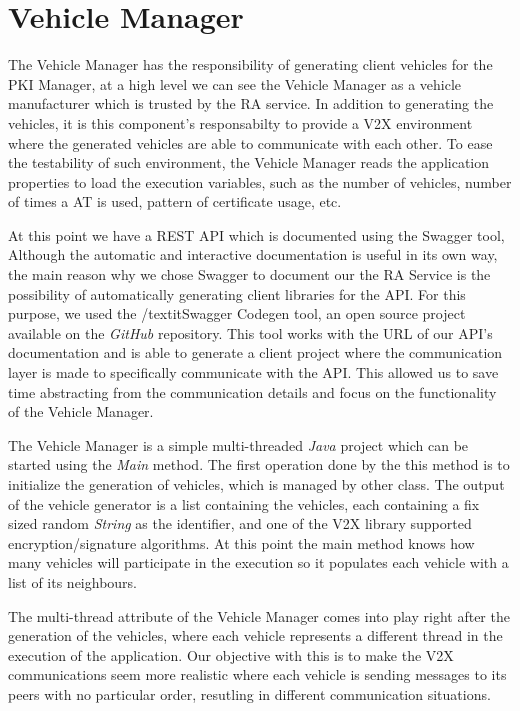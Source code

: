 \section{Vehicle Manager}
The Vehicle Manager has the responsibility of generating client vehicles for the PKI Manager, at a high level we can see the Vehicle Manager as a vehicle manufacturer which is trusted by the RA service. In addition to generating the vehicles, it is this component's responsabilty to provide a V2X environment where the generated vehicles are able to communicate with each other. To ease the testability of such environment, the Vehicle Manager reads the application properties to load the execution variables, such as the number of vehicles, number of times a AT is used, pattern of certificate usage, etc.

At this point we have a REST API which is documented using the Swagger tool, Although the automatic and interactive documentation is useful in its own way, the main reason why we chose Swagger to document our the RA Service is the possibility of automatically generating client libraries for the API. For this purpose, we used the /textit{Swagger Codegen} tool, an open source project available on the \textit{GitHub} repository. This tool works with the URL of our API's documentation and is able to generate a client project where the communication layer is made to specifically communicate with the API. This allowed us to save time abstracting from the communication details and focus on the functionality of the Vehicle Manager.

The Vehicle Manager is a simple multi-threaded \textit{Java} project which can be started using the \textit{Main} method. The first operation done by the this method is to initialize the generation of vehicles, which is managed by other class. The output of the vehicle generator is a list containing the vehicles, each containing a fix sized random \textit{String} as the identifier, and one of the V2X library supported encryption/signature algorithms. At this point the main method knows how many vehicles will participate in the execution so it populates each vehicle with a list of its neighbours. 

The multi-thread attribute of the Vehicle Manager comes into play right after the generation of the vehicles, where each vehicle represents a different thread in the execution of the application. Our objective with this is to make the V2X communications seem more realistic where each vehicle is sending messages to its peers with no particular order, resutling in different communication situations. 

